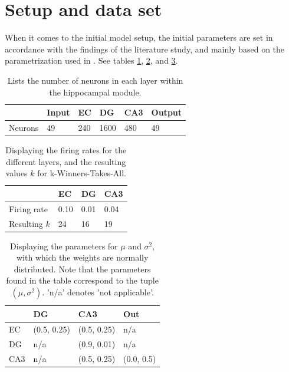\section{Setup and data set}

When it comes to the initial model setup, the initial parameters are set in accordance with the findings of the literature study, and mainly based on the parametrization used in \citep{Hattori2010, Hattori2014, Wakagi2008}. See tables \ref{table:number_of_neurons}, \ref{table:firing_rates}, and \ref{table:initial_weight_distributions}.

\begin{table}
\centering
\caption{Lists the number of neurons in each layer within the hippocampal module.}
\label{table:number_of_neurons}
\begin{tabular}{l|l|l|l|l|l|}
\cline{2-6}
                              & Input & EC  & DG   & CA3 & Output \\ \hline
\multicolumn{1}{|l|}{Neurons} & 49    & 240 & 1600 & 480 & 49     \\ \hline
\end{tabular}
\end{table}

\begin{table}
\centering
\caption{Displaying the firing rates for the different layers, and the resulting values $k$ for k-Winners-Takes-All.}
\label{table:firing_rates}
\begin{tabular}{l|l|l|l|}
\cline{2-4}
                                  & EC   & DG   & CA3  \\ \hline
\multicolumn{1}{|l|}{Firing rate} & 0.10 & 0.01 & 0.04 \\ \hline
\multicolumn{1}{|l|}{Resulting $k$} & 24 & 16 & 19 \\ \hline
\end{tabular}
\end{table}

\begin{table}[]
\centering
\caption{Displaying the parameters for $\mu$ and $\sigma^2$, with which the weights are normally distributed. Note that the parameters found in the table correspond to the tuple $(\mu, \sigma^2)$. 'n/a' denotes 'not applicable'.}
\label{table:initial_weight_distributions}
\begin{tabular}{l|l|l|l|}
\cline{2-4}
                          & DG        & CA3       & Out      \\ \hline
\multicolumn{1}{|l|}{EC}  & (0.5, 0.25) & (0.5, 0.25) & n/a      \\ \hline
\multicolumn{1}{|l|}{DG}  & n/a       & (0.9, 0.01) & n/a      \\ \hline
\multicolumn{1}{|l|}{CA3} & n/a       & (0.5, 0.25) & (0.0, 0.5) \\ \hline
\end{tabular}
\end{table}


